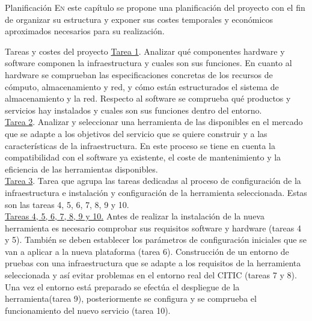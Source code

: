 \begin{chapter}{Planificación}
\label{chap:planificacionProyecto}
\lettrine{E}{n} este capítulo se propone una planificación del proyecto con el fin de organizar su estructura y exponer sus costes temporales y económicos aproximados necesarios para su realización.
\begin{section}{Tareas y costes del proyecto}
\underline{Tarea 1}. Analizar qué componentes hardware y software componen la infraestructura y cuales son sus funciones. En cuanto al hardware se comprueban las especificaciones concretas de los recursos de cómputo, almacenamiento y red, y cómo están estructurados el sistema de almacenamiento y la red. Respecto al software se comprueba qué productos y servicios hay instalados y cuales son sus funciones dentro del entorno.\\
\underline{Tarea 2}. Analizar y seleccionar una herramienta de las disponibles en el mercado que se adapte a los objetivos del servicio que se quiere construir y a las características de la infraestructura. En este proceso se tiene en cuenta la compatibilidad con el software ya existente, el coste de mantenimiento y la eficiencia de las herramientas disponibles.\\
\underline{Tarea 3}. Tarea que agrupa las tareas dedicadas al proceso de configuración de la infraestructura e instalación y configuración de la herramienta seleccionada. Estas son las tareas 4, 5, 6, 7, 8, 9 y 10.\\
\underline{Tareas 4, 5, 6, 7, 8, 9 y 10.} Antes de realizar la instalación de la nueva herramienta es necesario comprobar sus requisitos software y hardware (tareas 4 y 5). También se deben establecer los parámetros de configuración iniciales que se van a aplicar a la nueva plataforma (tarea 6). Construcción de un entorno de pruebas con una infraestructura que se adapte a los requisitos de la herramienta seleccionada y así evitar problemas en el entorno real del CITIC (tareas 7 y 8). Una vez el entorno está preparado se efectúa el despliegue de la herramienta(tarea 9), posteriormente se configura y se comprueba el funcionamiento del nuevo servicio (tarea 10).\\

\end{section}
\end{chapter}
